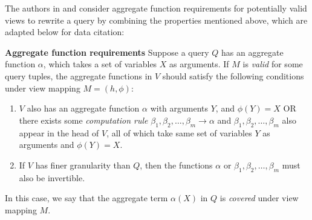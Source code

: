 The authors in \cite{cohen2006user} and \cite{cohen2006rewriting} consider aggregate function requirements for potentially valid views to rewrite a query by combining the properties mentioned above, which are adapted below for data citation:

\begin{definition}\label{Def: conditions_for_agg_functions}
{\bf Aggregate function requirements}
Suppose a query $Q$ has an aggregate function $\alpha$, which takes a set of variables $X$ as arguments.  If $M$ is {\em valid} for some query tuples, the aggregate functions in $V$ should satisfy the following conditions under view mapping $M = (h, \phi)$:
\begin{enumerate}
\item $V$ %
also has an aggregate function $\alpha$ with arguments $Y$, and $\phi(Y) = X$ OR there exists some {\em computation rule} $\beta_1, \beta_2, \dots, \beta_m \rightarrow \alpha$ and $\beta_1, \beta_2, \dots, \beta_m$ also appear in the head of $V$, all of which take same set of variables $Y$ as arguments and $\phi(Y) = X$.
\item If $V$ has finer granularity than $Q$, then the functions $\alpha$ or $\beta_1, \beta_2, \dots, \beta_m$ must also be invertible.
\end{enumerate}
In this case, we say that the aggregate term $\alpha(X)$ in $Q$ is {\em covered} under view mapping $M$.
\end{definition}

